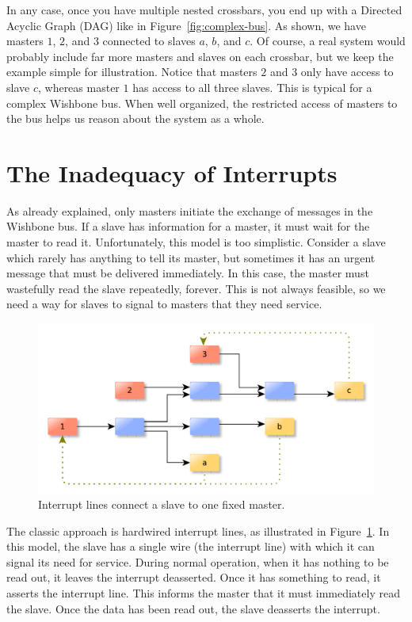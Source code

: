 \documentclass[a4paper]{jacow}
\begin{document}
In any case, once you have multiple nested crossbars, you end up with a
Directed Acyclic Graph (DAG) like in Figure~\ref{fig:complex-bus}.
As shown, we have masters $1$, $2$, and $3$ connected to slaves $a$, $b$, and $c$.
Of course, a real system would probably include far more masters and slaves on each
crossbar, but we keep the example simple for illustration.
Notice that masters $2$ and $3$ only have access to slave $c$,
whereas master $1$ has access to all three slaves.
This is typical for a complex Wishbone bus.
When well organized, the restricted access of masters to the bus helps
us reason about the system as a whole.

\section{The Inadequacy of Interrupts}

As already explained,
only masters initiate the exchange of messages in the Wishbone bus.
If a slave has information for a master, it must wait for the master to read it.
Unfortunately, this model is too simplistic.
Consider a slave which rarely has anything to tell its master,
but sometimes it has an urgent message that must be delivered immediately.
In this case, the master must wastefully read the slave repeatedly, forever.
This is not always feasible, so we need a way for slaves to signal to
masters that they need service.

\begin{figure}[t]
  \centering
 \includegraphics*[width=\columnwidth]{THHA2O03f4}
  \caption{Interrupt lines connect a slave to one fixed master.}
  \label{fig:bad-irq}
\end{figure}

The classic approach is hardwired interrupt lines,
as illustrated in Figure~\ref{fig:bad-irq}.
In this model, the slave has a single wire (the interrupt line) with which
it can signal its need for service.
During normal operation, when it has nothing to be read out,
it leaves the interrupt deasserted.
Once it has something to read, it asserts the interrupt line.
This informs the master that it must immediately read the slave.
Once the data has been read out, the slave deasserts the interrupt.
\end{document}
